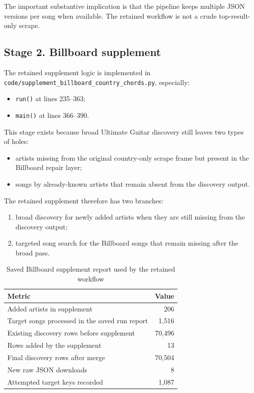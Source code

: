 \documentclass[11pt]{article}
\begin{document}
The important substantive implication is that the pipeline keeps multiple JSON
versions per song when available. The retained workflow is not a crude
top-result-only scrape.

\subsection{Stage 2. Billboard supplement}
The retained supplement logic is implemented in
\texttt{code/supplement\_billboard\_country\_chords.py}, especially:
\begin{itemize}[leftmargin=2em]
\item \texttt{run()} at lines 235--363;
\item \texttt{main()} at lines 366--390.
\end{itemize}

This stage exists because broad Ultimate Guitar discovery still leaves two
types of holes:
\begin{itemize}[leftmargin=2em]
\item artists missing from the original country-only scrape frame but present
in the Billboard repair layer;
\item songs by already-known artists that remain absent from the discovery
output.
\end{itemize}

The retained supplement therefore has two branches:
\begin{enumerate}[leftmargin=2em]
\item broad discovery for newly added artists when they are still missing from
the discovery output;
\item targeted song search for the Billboard songs that remain missing after
the broad pass.
\end{enumerate}

\begin{table}[H]
\centering
\caption{Saved Billboard supplement report used by the retained workflow}
\begin{tabularx}{\textwidth}{Y r}
\toprule
Metric & Value \\
\midrule
Added artists in supplement & 206 \\
Target songs processed in the saved run report & 1,516 \\
Existing discovery rows before supplement & 70,496 \\
Rows added by the supplement & 13 \\
Final discovery rows after merge & 70,504 \\
New raw JSON downloads & 8 \\
Attempted target keys recorded & 1,087 \\
\bottomrule
\end{tabularx}
\end{table}
\end{document}
